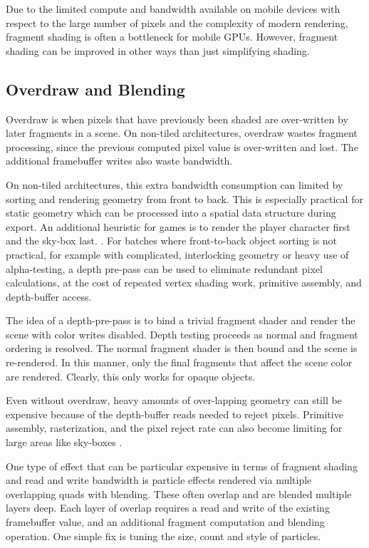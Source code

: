 
Due to the limited compute and bandwidth available on mobile devices with respect to the large number of pixels and the complexity of modern rendering, fragment shading is often a bottleneck for mobile GPUs.  However, fragment shading can be improved in other ways than just simplifying shading.

\subsection{Overdraw and Blending}\label{Jon-McCaffrey-Overdraw-And-Blending}
Overdraw is when pixels that have previously been shaded are over-written by later fragments in a scene.  On non-tiled architectures, overdraw wastes fragment processing, since the previous computed pixel value is over-written and lost.  The additional framebuffer writes also waste bandwidth.

On non-tiled architectures, this extra bandwidth consumption can limited by
sorting and rendering geometry from front to back.  This is especially
practical for static geometry which can be processed into a spatial data
structure during export.  An additional heuristic for games is to render the
player character first and the sky-box last.  \cite{fast_mobile_shaders}.  For
batches where front-to-back object sorting is not practical, for example with
complicated, interlocking geometry or heavy use of alpha-testing, a depth
pre-pass can be used to eliminate redundant pixel calculations, at the cost of
repeated vertex shading work, primitive assembly, and depth-buffer access.

The idea of a depth-pre-pass is to bind a trivial fragment shader and render the scene with color writes disabled.  Depth testing proceeds as normal and fragment ordering is resolved.  The normal fragment shader is then bound and the scene is re-rendered.  In this manner, only the final fragments that affect the scene color are rendered.  Clearly, this only works for opaque objects.

Even without overdraw, heavy amounts of over-lapping geometry can still be expensive because of the depth-buffer reads needed to reject pixels.  Primitive assembly, rasterization, and the pixel reject rate can also become limiting for large areas like sky-boxes \cite{fast_mobile_shaders}.

One type of effect that can be particular expensive in terms of fragment
shading and read and write bandwidth is particle effects rendered via multiple
overlapping quads with blending.  These often overlap and are blended multiple
layers deep.  Each layer of overlap requires a read and write of the existing
framebuffer value, and an additional fragment computation and blending
operation.  One simple fix is tuning the size, count and style of particles.

